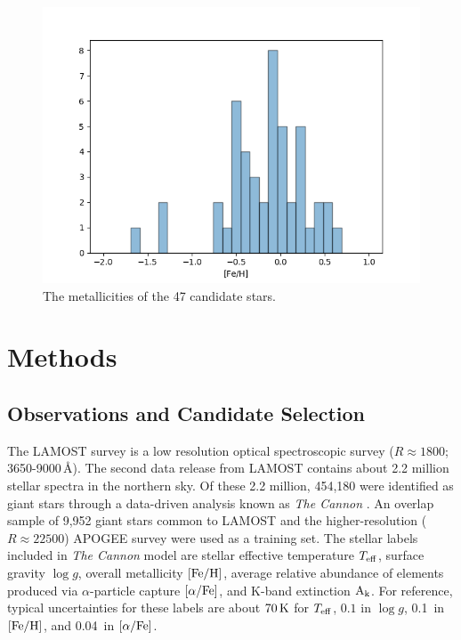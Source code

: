 \documentclass[a4paper,fleqn,usenatbib]{mnras}
\begin{document}
	\begin{figure}
		\includegraphics[width=\columnwidth]{metalhistpython}
		\caption{The metallicities of the 47 candidate stars.}
		\label{fig:metallicity}
	\end{figure}
	
	\section{Methods}
	
	\subsection{Observations and Candidate Selection}
	
	The LAMOST survey is a low resolution optical spectroscopic survey ($R\approx1800$; 3650-9000\,\AA). The second data release from LAMOST \citep{lamost} contains about 2.2 million stellar spectra in the northern sky. Of these 2.2 million, 454,180 were identified as giant stars through a data-driven analysis known as \textit{The Cannon} \citep{AnnaHo2017}. An overlap sample of 9,952 giant stars common to LAMOST and the higher-resolution ($R\approx22500$) APOGEE survey \citep{apogee} were used as a training set.
	The stellar labels included in \textit{The Cannon} model are stellar effective temperature $T_{\rm{eff}}$, surface gravity $\log{g}$, overall metallicity $\rm{[Fe/H]}$, average relative abundance of elements produced via $\alpha$-particle capture $\rm{[\alpha/Fe]}$, and K-band extinction $\rm{A_{k}}$. For reference, typical uncertainties for these labels are about $70\,\rm{K}$ for $T_{\rm{eff}}$, $0.1$ in $\log{g}$, 0.1\, in $\rm{[Fe/H]}$, and 0.04\, in $\rm{[\alpha/Fe]}$.
	
\end{document}
